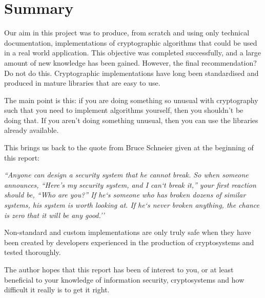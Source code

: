 \section{Summary}

Our aim in this project was to produce, from scratch and using only technical documentation, implementations of cryptographic algorithms that could be used in a real world application. This objective was completed successfully, and a large amount of new knowledge has been gained. However, the final recommendation? Do not do this. Cryptographic implementations have long been standardised and produced in mature libraries that are easy to use.

The main point is this: if you are doing something so unusual with cryptography such that you need to implement algorithms yourself, then you shouldn't be doing that. If you aren't doing something unusual, then you can use the libraries already available.

This brings us back to the quote from Bruce Schneier given at the beginning of this report: 

\textit{``Anyone can design a security system that he cannot break. So when someone announces, ``Here’s my security system, and I can`t break it,” your first reaction should be, “Who are you?” If he`s someone who has broken dozens of similar systems, his system is worth looking at. If he`s never broken anything, the chance is zero that it will be any good.''}

Non-standard and custom implementations are only truly safe when they have been created by developers experienced in the production of cryptosystems and tested thoroughly.

The author hopes that this report has been of interest to you, or at least beneficial to your knowledge of information security, cryptosystems and how difficult it really is to get it right.